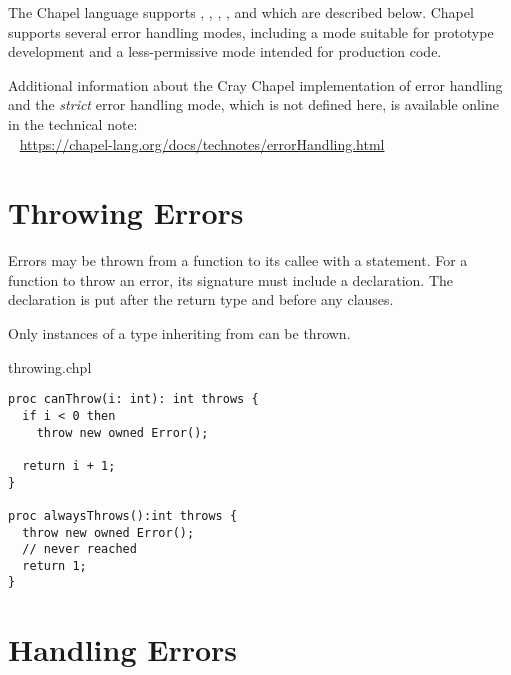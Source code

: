 \label{Error_Handling}

The Chapel language supports , , ,
, and  which are described below. Chapel
supports several error handling modes, including a mode suitable
for prototype development and a less-permissive mode intended
for production code.

\begin{craychapel}
Additional information about the Cray Chapel implementation of
error handling and the \emph{strict} error handling mode, which
is not defined here, is available online in the technical note:
\\ %
\mbox{$$ $$ $$} %
\url{https://chapel-lang.org/docs/technotes/errorHandling.html}
\end{craychapel}


\section{Throwing Errors}
\label{Throwing_Errors}

Errors may be thrown from a function to its callee with a 
statement. For a function to throw an error, its signature must include
a  declaration. The declaration is put after the return
type and before any  clauses.

Only  instances of a type inheriting from  can be
thrown.

\begin{chapelexample}{throwing.chpl}
\begin{chapel}
\begin{verbatim}
proc canThrow(i: int): int throws {
  if i < 0 then
    throw new owned Error();

  return i + 1;
}

proc alwaysThrows():int throws {
  throw new owned Error();
  // never reached
  return 1;
}
\end{verbatim}
\end{chapel}
\end{chapelexample}


\section{Handling Errors}
\label{Handling_Errors}

